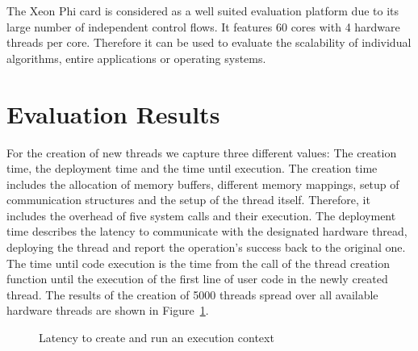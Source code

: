 The Xeon Phi card is considered as a well suited evaluation platform due to its
large number of independent control flows. It features 60 cores with 4 hardware
threads per core. Therefore it can be used to evaluate the scalability of
individual algorithms, entire applications or operating systems.

\section{Evaluation Results}
\label{sec:evaluation}

For the creation of new threads we capture three different values: The creation
time, the deployment time and the time until execution. The creation time
includes the allocation of memory buffers, different memory mappings, setup of
communication structures and the setup of the thread itself. Therefore, it
includes the overhead of five system calls and their execution. The deployment
time describes the latency to communicate with the designated hardware thread,
deploying the thread and report the operation's success back to the original
one. The time until code execution is the time from the call of the thread
creation function until the execution of the first line of user code in the
newly created thread. The results of the creation of 5000 threads spread
over all available hardware threads are shown in Figure~\ref{fig:EC-creation}.

\begin{figure}[ht!]
  \begin{center}
    \caption{Latency to create and run an execution context}
    \label{fig:EC-creation}
  \end{center}
\end{figure}

